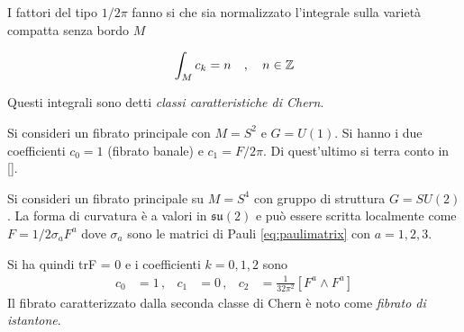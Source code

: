 I fattori del tipo $1/2\pi$ fanno si che sia normalizzato l'integrale sulla varietà
compatta senza bordo $M$

\begin{equation}
   \int_M c_k = n \quad , \quad n \in \mathbb{Z}
\end{equation}

Questi integrali sono detti \emph{classi caratteristiche di Chern}.\\

\begin{example}\label{ex:monopolechern}
   Si consideri un fibrato principale con $M = S^2$ e $G = U(1)$. Si hanno i due
   coefficienti $c_0 = 1$ (fibrato banale) e $c_1 = F/2\pi$. Di quest'ultimo si
   terra conto in \ref{}.\\
\end{example}

\begin{example}\label{ex:istantonchern}
   Si consideri un fibrato principale su $M = S^4$ con gruppo di struttura
   $G = SU(2)$. La forma di curvatura è a valori in $\mathfrak{su(2)}$ e può
   essere scritta localmente come $F = 1/2\sigma_a F^a$ dove $\sigma_a$ sono le
   matrici di Pauli \ref{eq:paulimatrix} con $a = 1,2,3$.

   Si ha quindi trF = 0 e i coefficienti $k = 0,1,2$ sono
   \begin{equation}
      \begin{aligned}
         c_0 & = 1 \, ,&
         c_1 & = 0 \, ,&
         c_2 & = \frac{1}{32\pi^2}[ F^a \wedge F^a ]
      \end{aligned}
   \end{equation}
   Il fibrato caratterizzato dalla seconda classe di Chern è noto come
   \emph{fibrato di istantone}.
\end{example}
